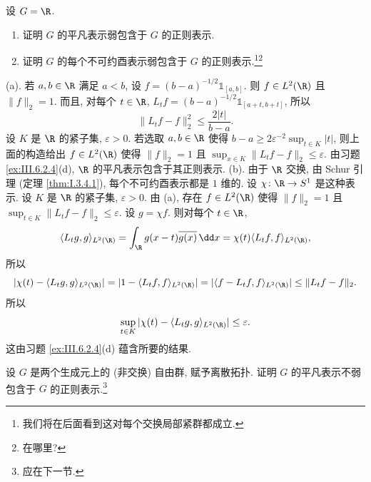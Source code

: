 \begin{exercise}[$G = \R$ 的情形]
\label{ex:III.6.2.7}
设 $G = \R$.
\begin{enumerate}
\item[(a)] 证明 $G$ 的平凡表示弱包含于 $G$ 的正则表示.
\item[(b)] 证明 $G$ 的每个不可约酉表示弱包含于 $G$ 的正则表示.\footnote{我们将在后面看到这对每个交换局部紧群都成立.}\footnote{在哪里?}
\end{enumerate}
\end{exercise}

\begin{solution}
(a). 若 $a, b \in \R$ 满足 $a < b$, 设 $f = (b-a)^{-1/2}\mathbb{1}_{[a,b]}$. 则 $f \in L^2(\R)$ 且 $\|f\|_2 = 1$. 而且, 对每个 $t \in \R$, $L_tf = (b-a)^{-1/2}\mathbb{1}_{[a+t,b+t]}$, 所以
\[
\|L_tf - f\|_2^2 \leq \frac{2|t|}{b-a}.
\]
设 $K$ 是 $\R$ 的紧子集, $\varepsilon > 0$. 若选取 $a, b \in \R$ 使得 $b - a \geq 2\varepsilon^{-2}\sup_{t \in K}|t|$, 则上面的构造给出 $f \in L^2(\R)$ 使得 $\|f\|_2 = 1$ 且 $\sup_{x \in K}\|L_tf - f\|_2 \leq \varepsilon$. 由习题 \ref{ex:III.6.2.4}(d), $\R$ 的平凡表示包含于其正则表示.
(b). 由于 $\R$ 交换, 由 Schur 引理 (定理 \ref{thm:I.3.4.1}), 每个不可约酉表示都是 $1$ 维的. 设 $\chi \colon \R \to S^1$ 是这种表示. 设 $K$ 是 $\R$ 的紧子集, $\varepsilon > 0$. 由 (a), 存在 $f \in L^2(\R)$ 使得 $\|f\|_2 = 1$ 且 $\sup_{t \in K}\|L_tf - f\|_2 \leq \varepsilon$. 设 $g = \chi f$. 则对每个 $t \in \R$,
\[
\langle L_tg, g \rangle_{L^2(\R)} = \int_{\R}g(x-t)\overline{g(x)}\,\dd x = \chi(t)\langle L_tf, f \rangle_{L^2(\R)},
\]
所以
\[
|\chi(t) - \langle L_tg, g \rangle_{L^2(\R)}| = |1 - \langle L_tf, f \rangle_{L^2(\R)}| = |\langle f - L_tf, f \rangle_{L^2(\R)}| \leq \|L_tf - f\|_2.
\]
所以
\[
\sup_{t \in K}|\chi(t) - \langle L_tg, g \rangle_{L^2(\R)}| \leq \varepsilon.
\]
这由习题 \ref{ex:III.6.2.4}(d) 蕴含所要的结果.
\end{solution}

\begin{exercise}[自由群的情形]
\label{ex:III.6.2.8}
设 $G$ 是两个生成元上的 (非交换) 自由群, 赋予离散拓扑. 证明 $G$ 的平凡表示不弱包含于 $G$ 的正则表示.\footnote{应在下一节.}
\end{exercise}

